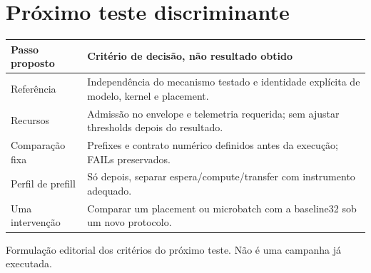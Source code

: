 \section{Próximo teste discriminante}

\begin{tabularx}{\linewidth}{@{}p{34mm}Y@{}}
\toprule \textbf{Passo proposto} & \textbf{Critério de decisão, não resultado obtido}\\ \midrule
Referência & Independência do mecanismo testado e identidade explícita de modelo, kernel e placement.\\
Recursos & Admissão no envelope e telemetria requerida; sem ajustar thresholds depois do resultado.\\
Comparação fixa & Prefixes e contrato numérico definidos antes da execução; FAILs preservados.\\
Perfil de prefill & Só depois, separar espera/compute/transfer com instrumento adequado.\\
Uma intervenção & Comparar um placement ou microbatch com a baseline32 sob um novo protocolo.\\
\bottomrule
\end{tabularx}
{\small Formulação editorial dos critérios do próximo teste. Não é uma campanha já executada. }
